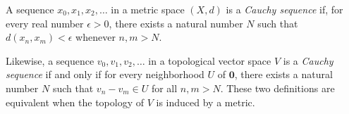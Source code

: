 \documentclass[12pt]{article}
\begin{document}
A sequence $x_0, x_1, x_2, \dots$ in a metric space $(X,d)$ is a \emph{Cauchy sequence} if, for every real number $\epsilon > 0$, there exists a natural number $N$ such that $d(x_n,x_m) < \epsilon$ whenever $n,m > N$.

Likewise, a sequence $v_0, v_1, v_2, \dots$ in a topological vector space $V$ is a \emph{Cauchy sequence} if and only if for every neighborhood $U$ of $\mathbf{0}$, there exists a natural number $N$ such that $v_n - v_m \in U$ for all $n,m > N$. These two definitions are equivalent when the topology of $V$ is induced by a metric.
\end{document}

